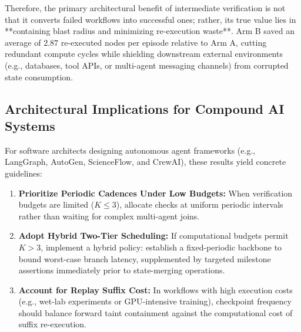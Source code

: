 Therefore, the primary architectural benefit of intermediate verification is not that it converts failed workflows into successful ones; rather, its true value lies in **containing blast radius and minimizing re-execution waste**. Arm B saved an average of $2.87$ re-executed nodes per episode relative to Arm A, cutting redundant compute cycles while shielding downstream external environments (e.g., databases, tool APIs, or multi-agent messaging channels) from corrupted state consumption.

\subsection{Architectural Implications for Compound AI Systems}
For software architects designing autonomous agent frameworks (e.g., LangGraph, AutoGen, ScienceFlow, and CrewAI), these results yield concrete guidelines:
\begin{enumerate}
    \item \textbf{Prioritize Periodic Cadences Under Low Budgets:} When verification budgets are limited ($K \le 3$), allocate checks at uniform periodic intervals rather than waiting for complex multi-agent joins.
    \item \textbf{Adopt Hybrid Two-Tier Scheduling:} If computational budgets permit $K > 3$, implement a hybrid policy: establish a fixed-periodic backbone to bound worst-case branch latency, supplemented by targeted milestone assertions immediately prior to state-merging operations.
    \item \textbf{Account for Replay Suffix Cost:} In workflows with high execution costs (e.g., wet-lab experiments or GPU-intensive training), checkpoint frequency should balance forward taint containment against the computational cost of suffix re-execution.
\end{enumerate}
